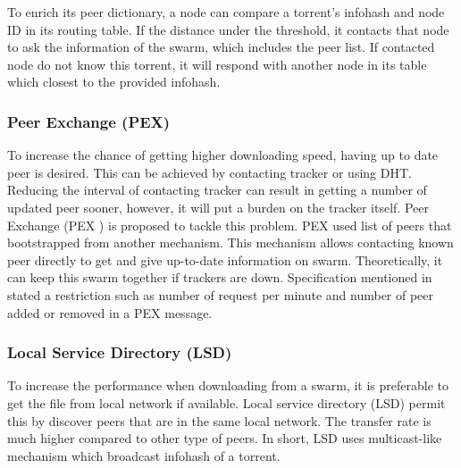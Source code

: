 To enrich its peer dictionary, a node can compare a torrent's infohash and node ID in its routing table. If the distance under the threshold, it contacts that node to ask the information of the swarm, which includes the peer list. If contacted node do not know this torrent, it will respond with another node in its table which closest to the provided infohash. 

\subsubsection{Peer Exchange (PEX)}
To increase the chance of getting higher downloading speed, having up to date peer is desired. This can be achieved by contacting tracker or using DHT. Reducing the interval of contacting tracker can result in getting a number of updated peer sooner, however, it will put a burden on the tracker itself. Peer Exchange (PEX )\cite{2015:PEX:the8472} is proposed to tackle this problem. PEX used list of peers that bootstrapped from another mechanism. This mechanism allows contacting known peer directly to get and give up-to-date information on swarm. Theoretically, it can keep this swarm together if trackers are down. Specification mentioned in \cite{2015:PEX:the8472} stated a restriction such as number of request per minute and number of peer added or removed in a PEX message.
	
\subsubsection{Local Service Directory (LSD)}
To increase the performance when downloading from a swarm, it is preferable to get the file from local network if available. Local service directory (LSD) permit this by discover peers that are in the same local network. The transfer rate is much higher compared to other type of peers. In short, LSD uses multicast-like mechanism which broadcast infohash of a torrent.
%



